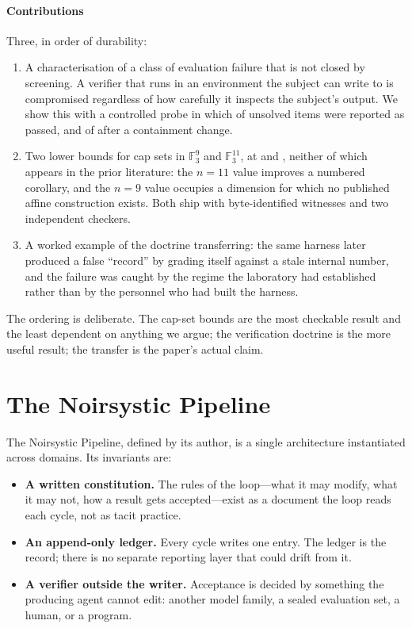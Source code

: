 \documentclass[journal]{IEEEtran}
\begin{document}
\paragraph{Contributions} Three, in order of durability:
\begin{enumerate}
\item A characterisation of a class of evaluation failure that is not
closed by screening. A verifier that runs in an environment the subject
can write to is compromised regardless of how carefully it inspects the
subject's output. We show this with a controlled probe in which
\NumShadowOldPass{} of \NumShadowN{} unsolved items were reported as
passed, and \NumShadowNewPass{} of \NumShadowN{} after a containment
change.
\item Two lower bounds for cap sets in $\mathbb{F}_3^9$ and
$\mathbb{F}_3^{11}$, at \NumCapNine{} and \NumCapEleven{}, neither of which
appears in the prior literature: the $n=11$ value improves a numbered
corollary, and the $n=9$ value occupies a dimension for which no published
affine construction exists. Both ship with byte-identified witnesses and two
independent checkers.
\item A worked example of the doctrine transferring: the same harness
later produced a false ``record'' by grading itself against a stale
internal number, and the failure was caught by the regime the laboratory
had established rather than by the personnel who had built the harness.
\end{enumerate}

The ordering is deliberate. The cap-set bounds are the most checkable
result and the least dependent on anything we argue; the verification
doctrine is the more useful result; the transfer is the paper's actual
claim.

\section{The Noirsystic Pipeline}

The Noirsystic Pipeline, defined by its author, is a single
architecture instantiated across domains. Its invariants are:

\begin{itemize}
\item \textbf{A written constitution.} The rules of the loop---what it
may modify, what it may not, how a result gets accepted---exist as a
document the loop reads each cycle, not as tacit practice.
\item \textbf{An append-only ledger.} Every cycle writes one entry. The
ledger is the record; there is no separate reporting layer that could
drift from it.
\item \textbf{A verifier outside the writer.} Acceptance is decided by
something the producing agent cannot edit: another model family, a
sealed evaluation set, a human, or a program.
\end{itemize}
\end{document}
